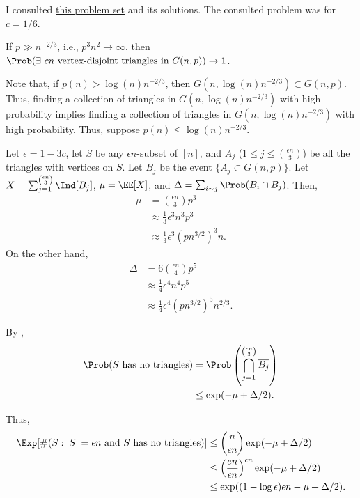 \documentclass[10pt, a4paper]{article}
\begin{document}
\begin{rem}
	I consulted \href{https://people.math.sc.edu/lu/teaching/2019spring_778/homework5.pdf}{this problem set} and its solutions. The consulted problem was for $c = 1/6$.
\end{rem}

\begin{prop}\label{prob:4:prop:2}
	If $p \gg n^{-2/3}$, i.e., $p^3n^2 \to \infty$, then $\Prob(\exists\ cn \text{ vertex-disjoint triangles in }G(n, p)) \to 1$.
\end{prop}
\begin{dem}
	Note that, if $p(n) > \log(n) n^{-2/3}$, then $G(n, \log(n)n^{-2/3}) \subset G(n, p)$. Thus, finding a collection of triangles in $G(n, \log(n)n^{-2/3})$ with high probability implies finding a collection of triangles in $G(n, \log(n)n^{-2/3})$ with high probability. Thus, suppose $p(n) \le \log(n)n^{-2/3}$.

	Let $\epsilon = 1 - 3c$, let $S$ be any $\epsilon n$-subset of $[n]$, and $A_j$ ($1 \le j \le \binom{\epsilon n}{3}$) be all the triangles with vertices on $S$. Let $B_j$ be the event $\{A_j \subset G(n, p)\}$. Let $X = \sum_{j=1}^{\binom{\epsilon n}{3}} \Ind[B_j]$,  $\mu = \EE[X]$, and $\Delta = \sum_{i \sim j} \Prob(B_i \cap B_j)$. Then,
	 \begin{align*}
		 \mu &= \binom{\epsilon n}{3} p^3\\
		 	 &\approx \frac{1}{3} \epsilon^3 n^3 p^3\\
			 &\approx \frac{1}{3} \epsilon^3 (pn^{3/2})^{3} n.
	\end{align*}
	On the other hand,
	\begin{align*}
		\Delta &= 6\binom{\epsilon n}{4} p^5 \\
			   &\approx \frac{1}{4} \epsilon^4 n^4 p^5\\
			   &\approx \frac{1}{4} \epsilon^4 (pn^{3/2})^{5} n^{2/3}.
	\end{align*}

	By ,
	\begin{align*}
		\Prob(S\text{ has no triangles}) &= \Prob\left(\bigcap_{j=1}^{\binom{\epsilon n}{3}} \overline{B_j}\right)\\
										 &\le \exp(-\mu + \Delta/2).
	\end{align*}

	Thus,
	\begin{align*}
		\Exp[\#(S : |S| = \epsilon n \text{ and } S \text{ has no triangles})] &\le \binom{n}{\epsilon n} \exp(-\mu+\Delta/2)\\
		&\le \left(\frac{en}{\epsilon n}\right)^{\epsilon n} \exp(-\mu + \Delta/2)\\
		&\le \exp((1-\log\epsilon)\epsilon n - \mu + \Delta/2).
	\end{align*}


\end{dem}
\end{document}
